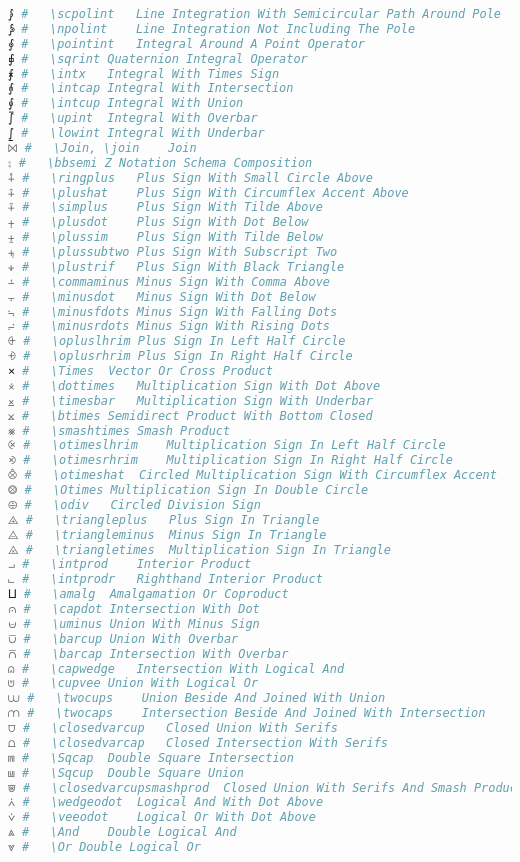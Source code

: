 \begin{lstlisting}[language=Julia, linewidth=\textwidth]
⨓ #   \scpolint   Line Integration With Semicircular Path Around Pole
⨔ #   \npolint    Line Integration Not Including The Pole
⨕ #   \pointint   Integral Around A Point Operator
⨖ #   \sqrint Quaternion Integral Operator
⨘ #   \intx   Integral With Times Sign
⨙ #   \intcap Integral With Intersection
⨚ #   \intcup Integral With Union
⨛ #   \upint  Integral With Overbar
⨜ #   \lowint Integral With Underbar
⨝ #   \Join, \join    Join
⨟ #   \bbsemi Z Notation Schema Composition
⨢ #   \ringplus   Plus Sign With Small Circle Above
⨣ #   \plushat    Plus Sign With Circumflex Accent Above
⨤ #   \simplus    Plus Sign With Tilde Above
⨥ #   \plusdot    Plus Sign With Dot Below
⨦ #   \plussim    Plus Sign With Tilde Below
⨧ #   \plussubtwo Plus Sign With Subscript Two
⨨ #   \plustrif   Plus Sign With Black Triangle
⨩ #   \commaminus Minus Sign With Comma Above
⨪ #   \minusdot   Minus Sign With Dot Below
⨫ #   \minusfdots Minus Sign With Falling Dots
⨬ #   \minusrdots Minus Sign With Rising Dots
⨭ #   \opluslhrim Plus Sign In Left Half Circle
⨮ #   \oplusrhrim Plus Sign In Right Half Circle
⨯ #   \Times  Vector Or Cross Product
⨰ #   \dottimes   Multiplication Sign With Dot Above
⨱ #   \timesbar   Multiplication Sign With Underbar
⨲ #   \btimes Semidirect Product With Bottom Closed
⨳ #   \smashtimes Smash Product
⨴ #   \otimeslhrim    Multiplication Sign In Left Half Circle
⨵ #   \otimesrhrim    Multiplication Sign In Right Half Circle
⨶ #   \otimeshat  Circled Multiplication Sign With Circumflex Accent
⨷ #   \Otimes Multiplication Sign In Double Circle
⨸ #   \odiv   Circled Division Sign
⨹ #   \triangleplus   Plus Sign In Triangle
⨺ #   \triangleminus  Minus Sign In Triangle
⨻ #   \triangletimes  Multiplication Sign In Triangle
⨼ #   \intprod    Interior Product
⨽ #   \intprodr   Righthand Interior Product
⨿ #   \amalg  Amalgamation Or Coproduct
⩀ #   \capdot Intersection With Dot
⩁ #   \uminus Union With Minus Sign
⩂ #   \barcup Union With Overbar
⩃ #   \barcap Intersection With Overbar
⩄ #   \capwedge   Intersection With Logical And
⩅ #   \cupvee Union With Logical Or
⩊ #   \twocups    Union Beside And Joined With Union
⩋ #   \twocaps    Intersection Beside And Joined With Intersection
⩌ #   \closedvarcup   Closed Union With Serifs
⩍ #   \closedvarcap   Closed Intersection With Serifs
⩎ #   \Sqcap  Double Square Intersection
⩏ #   \Sqcup  Double Square Union
⩐ #   \closedvarcupsmashprod  Closed Union With Serifs And Smash Product
⩑ #   \wedgeodot  Logical And With Dot Above
⩒ #   \veeodot    Logical Or With Dot Above
⩓ #   \And    Double Logical And
⩔ #   \Or Double Logical Or

\end{lstlisting}
